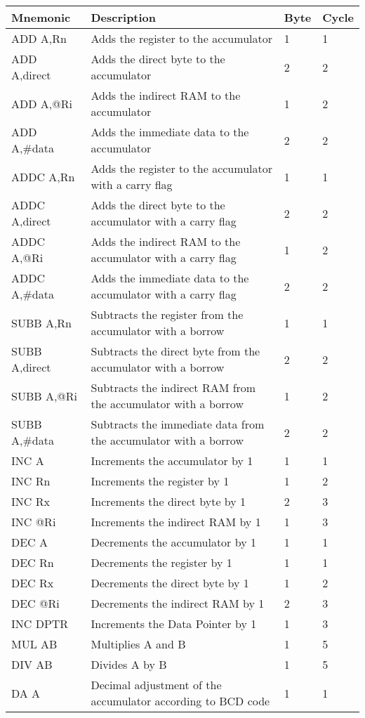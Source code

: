 \documentclass[
]{article}
\begin{document}
\begin{longtable}[]{@{}llll@{}}
\toprule
\textbf{Mnemonic} & \textbf{Description} & \textbf{Byte} &
\textbf{Cycle} \\
\midrule
\endhead
ADD A,Rn & Adds the register to the accumulator & 1 & 1 \\
ADD A,direct & Adds the direct byte to the accumulator & 2 & 2 \\
ADD A,@Ri & Adds the indirect RAM to the accumulator & 1 & 2 \\
ADD A,\#data & Adds the immediate data to the accumulator & 2 & 2 \\
ADDC A,Rn & Adds the register to the accumulator with a carry flag & 1 &
1 \\
ADDC A,direct & Adds the direct byte to the accumulator with a carry
flag & 2 & 2 \\
ADDC A,@Ri & Adds the indirect RAM to the accumulator with a carry flag
& 1 & 2 \\
ADDC A,\#data & Adds the immediate data to the accumulator with a carry
flag & 2 & 2 \\
SUBB A,Rn & Subtracts the register from the accumulator with a borrow &
1 & 1 \\
SUBB A,direct & Subtracts the direct byte from the accumulator with a
borrow & 2 & 2 \\
SUBB A,@Ri & Subtracts the indirect RAM from the accumulator with a
borrow & 1 & 2 \\
SUBB A,\#data & Subtracts the immediate data from the accumulator with a
borrow & 2 & 2 \\
INC A & Increments the accumulator by 1 & 1 & 1 \\
INC Rn & Increments the register by 1 & 1 & 2 \\
INC Rx & Increments the direct byte by 1 & 2 & 3 \\
INC @Ri & Increments the indirect RAM by 1 & 1 & 3 \\
DEC A & Decrements the accumulator by 1 & 1 & 1 \\
DEC Rn & Decrements the register by 1 & 1 & 1 \\
DEC Rx & Decrements the direct byte by 1 & 1 & 2 \\
DEC @Ri & Decrements the indirect RAM by 1 & 2 & 3 \\
INC DPTR & Increments the Data Pointer by 1 & 1 & 3 \\
MUL AB & Multiplies A and B & 1 & 5 \\
DIV AB & Divides A by B & 1 & 5 \\
DA A & Decimal adjustment of the accumulator according to BCD code & 1 &
1 \\
\bottomrule
\end{longtable}
\end{document}
